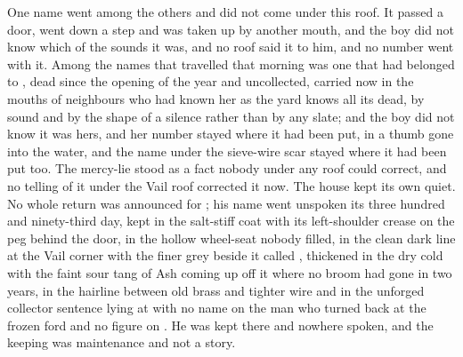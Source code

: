 One name went among the others and did not come under this roof. It passed a door, went down a step and was taken up by another mouth, and the boy did not know which of the sounds it was, and no roof said it to him, and no number went with it. Among the names that travelled that morning was one that had belonged to , dead since the opening of the year and uncollected, carried now in the mouths of neighbours who had known her as the yard knows all its dead, by sound and by the shape of a silence rather than by any slate; and the boy did not know it was hers, and her number stayed where it had been put, in a thumb gone into the water, and the name under the sieve-wire scar stayed where it had been put too. The mercy-lie stood as a fact nobody under any roof could correct, and no telling of it under the Vail roof corrected it now. The house kept its own quiet. No whole return was announced for ; his name went unspoken its three hundred and ninety-third day, kept in the salt-stiff coat with its left-shoulder crease on the peg behind the door, in the hollow wheel-seat nobody filled, in the clean dark line at the Vail corner with the finer grey beside it called , thickened in the dry cold with the faint sour tang of Ash coming up off it where no broom had gone in two years, in the hairline between old brass and tighter wire and in the unforged collector sentence lying at  with no name on the man who turned back at the frozen ford and no figure on . He was kept there and nowhere spoken, and the keeping was maintenance and not a story.

